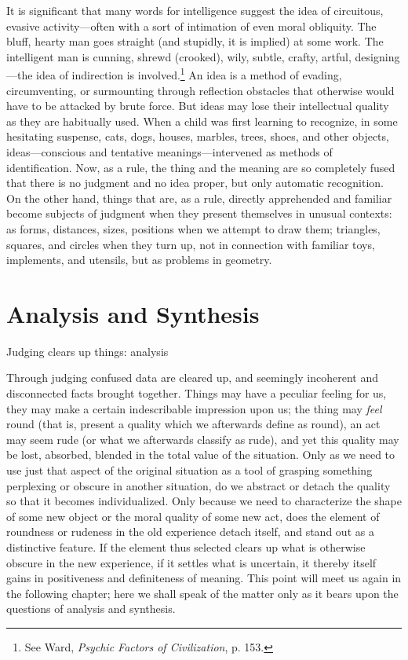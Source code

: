 \documentclass[letterpaper]{book}
\begin{document}
It is significant that many words for intelligence suggest the idea of
circuitous, evasive activity---often with a sort of intimation of even
moral obliquity. The bluff, hearty man goes straight (and stupidly, it
is implied) at some work. The intelligent man is cunning, shrewd
(crooked), wily, subtle, crafty, artful, designing---the idea of
indirection is
involved.\footnote{
See Ward, \emph{Psychic Factors of Civilization}, p. 153.
}
An idea is a method of evading, circumventing, or surmounting through
reflection obstacles that otherwise would have to be attacked by brute
force. But ideas may lose their intellectual quality as they are
habitually used. When a child was first learning to recognize, in some
hesitating suspense, cats, dogs, houses, marbles, trees, shoes, and
other objects, ideas---conscious and tentative meanings---intervened as
methods of identification. Now, as a rule, the thing and the meaning are
so completely fused that there is no judgment and no idea proper, but
only automatic recognition. On the other hand, things that are, as a
rule, directly apprehended and familiar become subjects of judgment when
they present themselves in unusual contexts: as forms, distances, sizes,
positions when we attempt to draw them; triangles, squares, and circles
when they turn up, not in connection with familiar toys, implements, and
utensils, but as problems in geometry.



\section{Analysis and Synthesis}

Judging clears up things: analysis

Through judging confused data are cleared up, and seemingly incoherent
and disconnected facts brought together. Things may have a peculiar
feeling for us, they may make a certain indescribable impression upon
us; the thing may \emph{feel} round (that is, present a quality which we
afterwards define as round), an act may seem rude (or what we afterwards
classify as rude), and yet this quality may be lost, absorbed, blended
in the total value of the situation. Only as we need to use just that
aspect of the original situation as a tool of grasping something
perplexing or obscure in another situation, do we abstract or detach the
quality so that it becomes individualized. Only because we need to
characterize the shape of some new object or the moral quality of some
new act, does the element of roundness or rudeness in the old experience
detach itself, and stand out as a distinctive feature. If the element
thus selected clears up what is otherwise obscure in the new experience,
if it settles what is uncertain, it thereby itself gains in positiveness
and definiteness of meaning. This point will meet us again in the
following chapter; here we shall speak of the matter only as it bears
upon the questions of analysis and synthesis.
\end{document}
